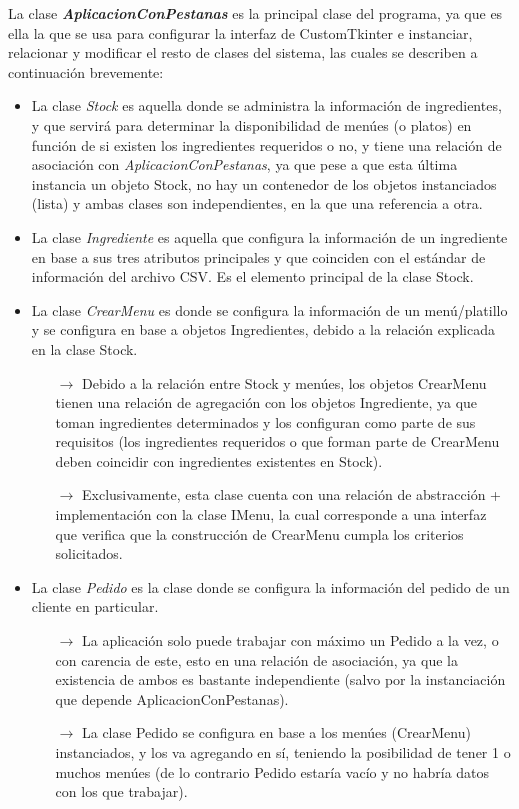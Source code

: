 \documentclass[a4paper,12pt]{article}
\begin{document}
La clase \textbf{\textit{AplicacionConPestanas}} es la principal clase del programa, ya que es ella la que se usa para configurar la interfaz de CustomTkinter e instanciar, relacionar y modificar el resto de clases del sistema, las cuales se describen a continuación brevemente:
\begin{itemize}

    \item La clase \textit{Stock} es aquella donde se administra la información de ingredientes, y que servirá para determinar la disponibilidad de menúes (o platos) en función de si existen los ingredientes requeridos o no, y tiene una relación de asociación con \textit{AplicacionConPestanas}, ya que pese a que esta última instancia un objeto Stock, no hay un contenedor de los objetos instanciados (lista) y ambas clases son independientes, en la que una referencia a otra.
    
    \item La clase \textit{Ingrediente} es aquella que configura la información de un ingrediente en base a sus tres atributos principales y que coinciden con el estándar de información del archivo CSV. Es el elemento principal de la clase Stock.
    
    \item La clase \textit{CrearMenu} es donde se configura la información de un menú/platillo y se configura en base a objetos Ingredientes, debido a la relación explicada en la clase Stock.
    \begin{itemize}
        \item[$\rightarrow$] Debido a la relación entre Stock y menúes, los objetos CrearMenu tienen una relación de agregación con los objetos Ingrediente, ya que toman ingredientes determinados y los configuran como parte de sus requisitos (los ingredientes requeridos o que forman parte de CrearMenu deben coincidir con ingredientes existentes en Stock).
        \item[$\rightarrow$] Exclusivamente, esta clase cuenta con una relación de abstracción + implementación con la clase IMenu, la cual corresponde a una interfaz que verifica que la construcción de CrearMenu cumpla los criterios solicitados.
    \end{itemize}
    
    \item La clase \textit{Pedido} es la clase donde se configura la información del pedido de un cliente en particular.
    
        \begin{itemize}
            \item[$\rightarrow$] La aplicación solo puede trabajar con máximo un Pedido a la vez, o con carencia de este, esto en una relación de asociación, ya que la existencia de ambos es bastante independiente (salvo por la instanciación que depende AplicacionConPestanas).
            \item[$\rightarrow$] La clase Pedido se configura en base a los menúes (CrearMenu) instanciados, y los va agregando en sí, teniendo la posibilidad de tener 1 o muchos menúes (de lo contrario Pedido estaría vacío y no habría datos con los que trabajar).
        \end{itemize}
        

\end{itemize}
\end{document}
